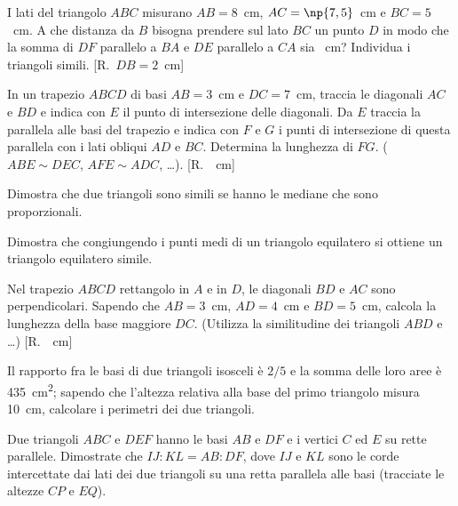 \begin{multicols}{2}
\begin{esercizio}
\label{ese:6.80}
I lati del triangolo $ABC$ misurano $AB=8$~cm, $AC=\np{7,5}$~cm e $BC=5$~cm. A che distanza da $B$ bisogna prendere sul lato $BC$ un punto $D$ in modo che la somma di $DF$ parallelo a $BA$ e $DE$ parallelo a $CA$ sia ~cm? Individua i triangoli simili.	[R.~$DB=2$~cm]
\end{esercizio}

\begin{esercizio}
\label{ese:6.81}
In un trapezio $ABCD$ di basi $AB=3$~cm e $DC=7$~cm, traccia le diagonali $AC$ e $BD$ e indica con $E$ il punto di intersezione delle diagonali. Da $E$ traccia la parallela alle basi del trapezio e indica con $F$ e $G$ i punti di intersezione di questa parallela con i lati obliqui $AD$ e $BC$. Determina la lunghezza di $FG$. ($ABE\sim DEC$, $AFE\sim ADC$, \ldots). [R.~~cm]
\end{esercizio}

\begin{esercizio}
\label{ese:6.82}
Dimostra che due triangoli sono simili se hanno le mediane che sono proporzionali.
\end{esercizio}

\begin{esercizio}
\label{ese:6.83}
Dimostra che congiungendo i punti medi di un triangolo equilatero si ottiene un triangolo equilatero simile.
\end{esercizio}

\begin{esercizio}
\label{ese:6.84}
Nel trapezio $ABCD$ rettangolo in $A$ e in $D$, le diagonali $BD$ e $AC$ sono perpendicolari. Sapendo che $AB=3$~cm, $AD=4$~cm e $BD=5$~cm, calcola la lunghezza della base maggiore $DC$. (Utilizza la similitudine dei triangoli $ABD$ e \ldots{})	[R.~~cm]
\end{esercizio}

\begin{esercizio}
\label{ese:6.85}
Il rapporto fra le basi di due triangoli isosceli è $2/5$ e la somma delle loro aree è 435~cm\textsuperscript{2}; sapendo che l'altezza relativa alla base del primo triangolo misura 10~cm, calcolare i perimetri dei due triangoli. 
\end{esercizio}

\begin{esercizio}
\label{ese:6.86}
Due triangoli $ABC$ e $DEF$ hanno le basi $AB$ e $DF$ e i vertici $C$ ed $E$ su rette parallele. Dimostrate che $IJ:KL=AB:DF$, dove $IJ$ e $KL$ sono le corde intercettate dai lati dei due triangoli su una retta parallela alle basi (tracciate le altezze $CP$ e $EQ$).
\end{esercizio}


\end{multicols}
